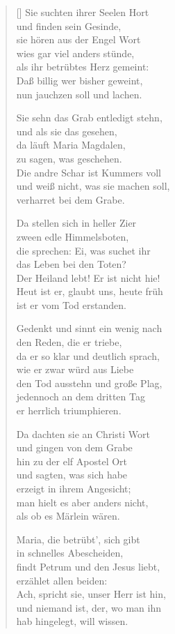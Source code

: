 \begin{multicols}{2}
\begin{verse}[\versewidth]
 Sie suchten ihrer Seelen Hort\\
und finden sein Gesinde,\\
sie hören aus der Engel Wort\\
wies gar viel anders stünde,\\
als ihr betrübtes Herz gemeint:\\
Daß billig wer bisher geweint,\\
nun jauchzen soll und lachen.

 Sie sehn das Grab entledigt stehn,\\
und als sie das gesehen,\\
da läuft Maria Magdalen,\\
zu sagen, was geschehen.\\
Die andre Schar ist Kummers voll\\
und weiß nicht, was sie machen soll,\\
verharret bei dem Grabe.

 Da stellen sich in heller Zier\\
zween edle Himmelsboten,\\
die sprechen: Ei, was suchet ihr\\
das Leben bei den Toten?\\
Der Heiland lebt! Er ist nicht hie!\\
Heut ist er, glaubt uns, heute früh\\
ist er vom Tod erstanden.

 Gedenkt und sinnt ein wenig nach\\
den Reden, die er triebe,\\
da er so klar und deutlich sprach,\\
wie er zwar würd aus Liebe\\
den Tod ausstehn und große Plag,\\
jedennoch an dem dritten Tag\\
er herrlich triumphieren.

 Da dachten sie an Christi Wort\\
und gingen von dem Grabe\\
hin zu der elf Apostel Ort\\
und sagten, was sich habe\\
erzeigt in ihrem Angesicht;\\
man hielt es aber anders nicht,\\
als ob es Märlein wären.

 Maria, die betrübt', sich gibt\\
in schnelles Abescheiden,\\
findt Petrum und den Jesus liebt,\\
erzählet allen beiden:\\
Ach, spricht sie, unser Herr ist hin,\\
und niemand ist, der, wo man ihn\\
hab hingelegt, will wissen.


\end{verse}
\end{multicols}
